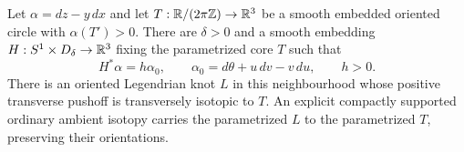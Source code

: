 \begin{lemma}
\label{fd:transverse-neighborhood}
Let $\alpha=dz-y\,dx$ and let
$T:\mathbb R/(2\pi\mathbb Z)\to\mathbb R^3$ be a smooth embedded oriented circle
with $\alpha(T')>0$. There are $\delta>0$ and a smooth embedding
$H:S^1\times D_\delta\to\mathbb R^3$ fixing the parametrized core $T$ such that
\begin{equation}\label{fd:transverse-model}
 H^*\alpha=h\alpha_0,\qquad
 \alpha_0=d\theta+u\,dv-v\,du,\qquad h>0.
\end{equation}
There is an oriented Legendrian knot $L$ in this neighbourhood whose
positive transverse pushoff is transversely isotopic to $T$. An explicit
compactly supported ordinary ambient isotopy carries the parametrized
$L$ to the parametrized $T$, preserving their orientations.
\end{lemma}
